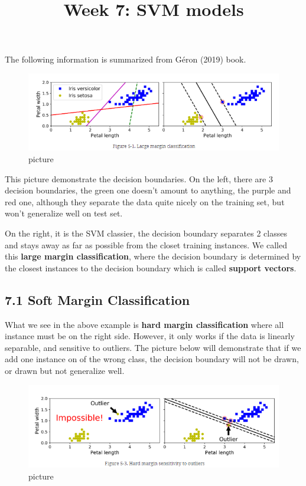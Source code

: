 \documentclass[
  letterpaper,
  DIV=11,
  numbers=noendperiod]{scrartcl}
\title{Week 7: SVM models}
\author{}
\date{}
\begin{document}
\maketitle

The following information is summarized from Géron (2019) book.

\begin{figure}[H]

{\centering \includegraphics{1.png}

}

\caption{picture}

\end{figure}%

This picture demonstrate the decision boundaries. On the left, there are
3 decision boundaries, the green one doesn't amount to anything, the
purple and red one, although they separate the data quite nicely on the
training set, but won't generalize well on test set.

On the right, it is the SVM classier, the decision boundary separates 2
classes and stays away as far as possible from the closet training
instances. We called this \textbf{large margin classification}, where
the decision boundary is determined by the closest instances to the
decision boundary which is called \textbf{support vectors}.

\subsection{7.1 Soft Margin
Classification}\label{soft-margin-classification}

What we see in the above example is \textbf{hard margin classification}
where all instance must be on the right side. However, it only works if
the data is linearly separable, and sensitive to outliers. The picture
below will demonstrate that if we add one instance on of the wrong
class, the decision boundary will not be drawn, or drawn but not
generalize well.

\begin{figure}[H]

{\centering \includegraphics{2.png}

}

\caption{picture}

\end{figure}%
\end{document}

